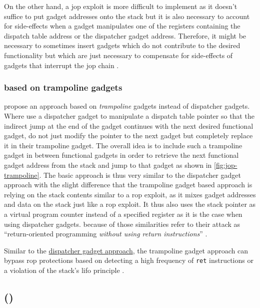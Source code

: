 On the other hand, a \gls{jop} exploit is more difficult to implement as it doesn't suffice to put gadget addresses onto the stack but it is also necessary to account for side-effects when a gadget manipulates one of the registers containing the dispatch table address or the dispatcher gadget address.
Therefore, it might be necessary to sometimes insert gadgets which do not contribute to the desired functionality but which are just necessary to compensate for side-effects of gadgets that interrupt the \gls{jop} chain \cite{Bletsch2011}.

\subsubsection{ based on trampoline gadgets}
\label{subsubsec:cr-jop-trampoline}

\citeauthor{Checkoway2010} propose an approach based on \emph{trampoline} gadgets instead of dispatcher gadgets.
Where \citeauthor{Bletsch2011} use a dispatcher gadget to manipulate a dispatch table pointer so that the indirect jump at the end of the gadget continues with the next desired functional gadget, \citeauthor{Checkoway2010} do not just modify the pointer to the next gadget but completely replace it in their trampoline gadget.
The overall idea is to include such a trampoline gadget in between functional gadgets in order to retrieve the next functional gadget address from the stack and jump to that gadget as shown in \cref{fig:jop-trampoline}.
The basic approach is thus very similar to the dispatcher gadget approach with the slight difference that the trampoline gadget based approach is relying on the stack contents similar to a \gls{rop} exploit, as it mixes gadget addresses and data on the stack just like a \gls{rop} exploit.
It thus also uses the stack pointer as a virtual program counter instead of a specified register as it is the case when using dispatcher gadgets.
\citeauthor{Checkoway2010} because of those similarities refer to their attack as ``return-oriented programming \textit{without using return instructions}'' \cite{Checkoway2010}.

Similar to the \hyperref[subsubsec:cr-jop-dispatcher]{dispatcher gadget approach}, the trampoline gadget approach can bypass \gls{rop} protections based on detecting a high frequency of \texttt{ret} instructions or a violation of the stack's \gls{lifo} principle \cite{Checkoway2010}.

\subsection{ ()}
\label{subsec:cr-cop}

